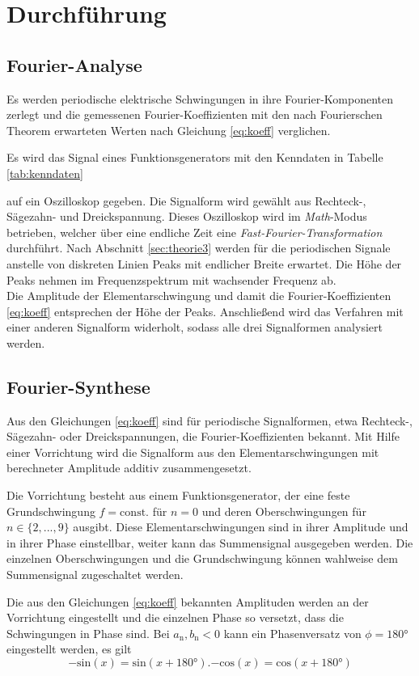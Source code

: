 \section{Durchführung}
\label{sec:Durchfuehrung}
\subsection{Fourier-Analyse}
Es werden periodische elektrische Schwingungen in ihre Fourier-Komponenten zerlegt und die gemessenen Fourier-Koeffizienten mit den nach Fourierschen Theorem erwarteten Werten nach Gleichung \ref{eq:koeff} verglichen.

Es wird das Signal eines Funktionsgenerators mit den Kenndaten in Tabelle \ref{tab:kenndaten}
\begin{figure}
\end{figure}
auf ein Oszilloskop gegeben.
Die Signalform wird gewählt aus Rechteck-, Sägezahn- und Dreickspannung.
Dieses Oszilloskop wird im \textit{Math}-Modus betrieben, welcher über eine endliche Zeit eine \textit{Fast-Fourier-Transformation} \cite{FFT} durchführt. 
Nach Abschnitt \ref{sec:theorie3} werden für die periodischen Signale anstelle von diskreten Linien Peaks mit endlicher Breite erwartet. 
Die Höhe der Peaks nehmen im Frequenzspektrum mit wachsender Frequenz ab.\\
Die Amplitude der Elementarschwingung und damit die Fourier-Koeffizienten \ref{eq:koeff} entsprechen der Höhe der Peaks. 
Anschließend wird das Verfahren mit einer anderen Signalform widerholt, sodass alle drei Signalformen analysiert werden.
%

\subsection{Fourier-Synthese}
Aus den Gleichungen \ref{eq:koeff} sind für periodische Signalformen, etwa Rechteck-, Sägezahn- oder Dreickspannungen, die Fourier-Koeffizienten bekannt. 
Mit Hilfe einer Vorrichtung wird die Signalform aus den Elementarschwingungen mit berechneter Amplitude additiv zusammengesetzt.

Die Vorrichtung besteht aus einem Funktionsgenerator, der eine feste Grundschwingung $f=\mathup{const.}$ für $n=0$ und deren Oberschwingungen für $n\in\{2,...,9\}$ ausgibt.
Diese Elementarschwingungen sind in ihrer Amplitude und in ihrer Phase einstellbar, weiter kann das Summensignal ausgegeben werden.
Die einzelnen Oberschwingungen und die Grundschwingung können wahlweise dem Summensignal zugeschaltet werden.

Die aus den Gleichungen \ref{eq:koeff} bekannten Amplituden werden an der Vorrichtung eingestellt und die einzelnen Phase so versetzt, dass die Schwingungen in Phase sind.
Bei $a_\text{n}, b_\text{n}<0$ kann ein Phasenversatz von $\phi=180°$ eingestellt werden, es gilt
\begin{subequations}
	\begin{equation}
		-\mathup{sin}(x)=\mathup{sin}(x+180°).
	\end{equation}
	\begin{equation}
		-\mathup{cos}(x)=\mathup{cos}(x+180°)
	\end{equation}
\end{subequations}
